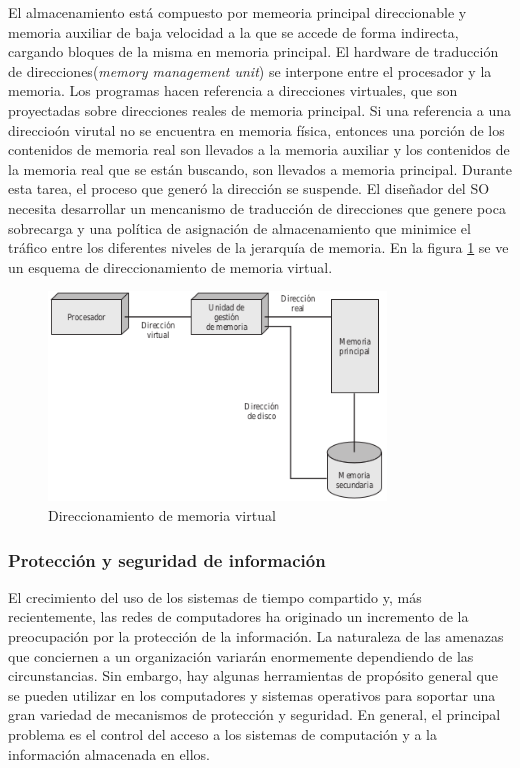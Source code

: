 \documentclass{article}
\begin{document}
				El almacenamiento está compuesto por memeoria principal direccionable y memoria auxiliar de baja velocidad a la que se accede de forma indirecta, cargando bloques de la misma en memoria principal. El hardware de traducción de direcciones(\textit{memory management unit}) se interpone entre el procesador y la memoria. Los programas hacen referencia a direcciones virtuales, que son proyectadas sobre direcciones reales de memoria principal. Si una referencia a una direccioón virutal no se encuentra en memoria física, entonces una porción de los contenidos de memoria real son llevados a la memoria auxiliar y los contenidos de la memoria real que se están buscando, son llevados a memoria principal. Durante esta tarea, el proceso que generó la dirección se suspende. El diseñador del SO necesita desarrollar un mencanismo de traducción de direcciones que genere poca sobrecarga y una política de asignación de almacenamiento que minimice el tráfico entre los diferentes niveles de la jerarquía de memoria. En la figura \ref{figura19:direccionamientomemvirtual} se ve un esquema de direccionamiento de memoria virtual.
				
				\begin{figure}
				\caption{Direccionamiento de memoria virtual}
				\label{figura19:direccionamientomemvirtual}
				\centering
				\includegraphics[width=0.8\textwidth, scale=1]{figura19.png}
				\end{figure}
				
			\subsubsection{Protección y seguridad de información}	
				El crecimiento del uso de los sistemas de tiempo compartido y, más recientemente, las redes de computadores ha originado un incremento de la preocupación por la protección de la información. La naturaleza de las amenazas que conciernen a un organización variarán enormemente dependiendo de las circunstancias. Sin embargo, hay algunas herramientas de propósito general que se pueden utilizar en los computadores y sistemas operativos para soportar una gran variedad de mecanismos de protección y seguridad. En general, el principal problema es el control del acceso a los sistemas de computación y a la información almacenada en ellos. \\
				
\end{document}
